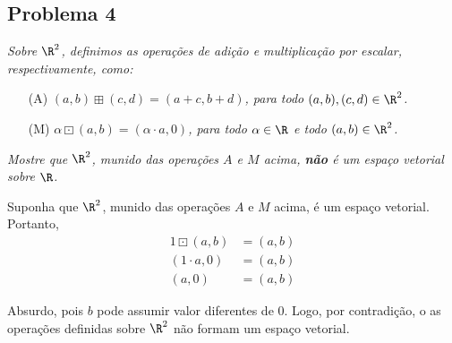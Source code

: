 \subsection*{Problema 4}
\textit{Sobre  $\R^2$,  definimos as  operações  de  adição  e multiplicação  por
escalar, respectivamente, como:}
\begin{itemize}
\item[(A)] \textit{ $( a , b ) \boxplus ( c , d ) = ( a + c , b + d )$, para todo $(a,b), (c,d) \in \R^2$.}

\item[(M)] \textit{ $\alpha \boxdot  ( a , b )  = ( \alpha \cdot a , 0  )$, para todo $\alpha \in \R$ e todo $( a , b ) \in \R^2$.}
\end{itemize}
\textit{Mostre que $\R^2$, munido das  operações $A$ e $M$ acima, \textbf{não}
é um espaço vetorial sobre $\R$.}

Suponha que $\R^2$, munido das  operações $A$ e $M$ acima,
é um espaço vetorial. \\
Portanto,
\begin{align*}
    1 \boxdot (a, b) &= (a, b) \tag{EV-M2} \\
    (1 \cdot a, 0) &= (a, b) \tag{M} \\
    (a, 0) &= (a, b)
\end{align*}

Absurdo, pois $b$ pode assumir valor diferentes de $0$. Logo, por contradição, o as operações definidas sobre $\R^2$ não formam um 
espaço vetorial.
